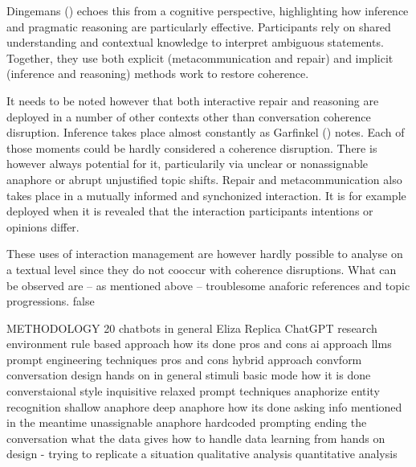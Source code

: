 \documentclass[12pt]{report}
\begin{document}
{\par
Dingemans () echoes this from a cognitive perspective,
highlighting how inference and pragmatic reasoning are particularly effective.
Participants rely on shared understanding and contextual knowledge to interpret ambiguous statements.
Together, they use both
explicit (metacommunication and repair) and
implicit (inference and reasoning)
methods work to restore coherence.

\par
It needs to be noted however that both interactive repair and reasoning are
deployed in a number of other contexts
other than conversation coherence disruption.
Inference takes place almost constantly as Garfinkel () notes.
Each of those moments could be hardly considered a coherence disruption.
There is however always potential for it,
particularily via unclear or nonassignable anaphore or abrupt unjustified topic shifts.
Repair and metacommunication also takes place in a mutually informed and synchonized interaction.
It is for example deployed when it is revealed
that the interaction participants intentions or opinions differ.

\par
These uses of interaction management are however
hardly possible to analyse on a textual level
since they do not cooccur with coherence disruptions.
What can be observed are – as mentioned above –
troublesome anaforic references and topic progressions.
\if false

METHODOLOGY 20
    chatbots in general
        Eliza
        Replica
        ChatGPT
	research environment
	rule based approach
		how its done
		pros and cons
	ai approach
		llms
		prompt engineering techniques
		pros and cons
	hybrid approach
	convform
	conversation design hands on
		in general
		stimuli
			basic mode
				how it is done
				converstaional style
					inquisitive
					relaxed
			prompt techniques
				anaphorize
				entity recognition
			shallow anaphore
			deep anaphore
				how its done
				asking info mentioned in the meantime
			unassignable anaphore
				hardcoded
				prompting
		ending the conversation
	what the data gives
	how to handle data
	learning from
	    hands on design - trying to replicate a situation
		qualitative analysis
		quantitative analysis

}
\end{document}
